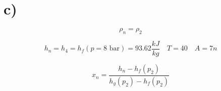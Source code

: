 

\section*{c)}

\[
\rho_n = \rho_2
\]

\[
h_n = h_4 = h_f(p = 8 \text{ bar}) = 93.62 \frac{kJ}{kg} \quad T = 40 \quad A = 7n
\]

\[
x_n = \frac{h_n - h_f(p_2)}{h_g(p_2) - h_f(p_2)}
\]